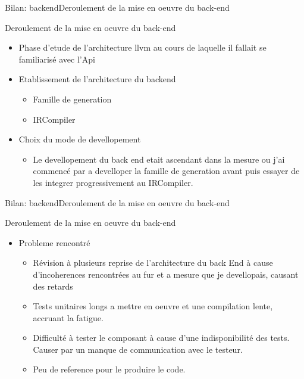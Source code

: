    \begin{frame}{Bilan: backend}{Deroulement de la mise en oeuvre du back-end}
    	\begin{block}{Deroulement de la mise en oeuvre du back-end}
	    	\begin{itemize}
				\item<1-> Phase d'etude de l'architecture llvm au cours de laquelle il fallait se familiarisé avec l'Api

				\item<2-> Etablissement de l'architecture du backend
					\begin{itemize}
						\item<3-> Famille de generation
						\item<4-> IRCompiler
					\end{itemize}

				\item<5-> Choix du mode de devellopement
					\begin{itemize}
						\item<6-> Le devellopement du back end etait ascendant dans la mesure ou j'ai commencé par a develloper la famille de generation avant puis essayer de les integrer progressivement au IRCompiler.
					\end{itemize}

	    	\end{itemize}
	    \end{block}
    \end{frame}

    \begin{frame}{Bilan: backend}{Deroulement de la mise en oeuvre du back-end}
    	\begin{block}{Deroulement de la mise en oeuvre du back-end}
	    	\begin{itemize}
				\item<1-> Probleme rencontré
				\begin{itemize}
					\item<2-> Révision à plusieurs reprise de l'architecture du back End à cause d'incoherences rencontrées au fur et a mesure que je devellopais, causant des retards

					\item<3-> Tests unitaires longs a mettre en oeuvre et une compilation lente, accruant la fatigue.

					\item<4-> Difficulté à tester le composant à cause d'une indisponibilité des tests. Causer par un manque de communication avec le testeur.

					\item<5-> Peu de reference pour le produire le code.
					
				\end{itemize}

	    	\end{itemize}
	    \end{block}
    \end{frame}

